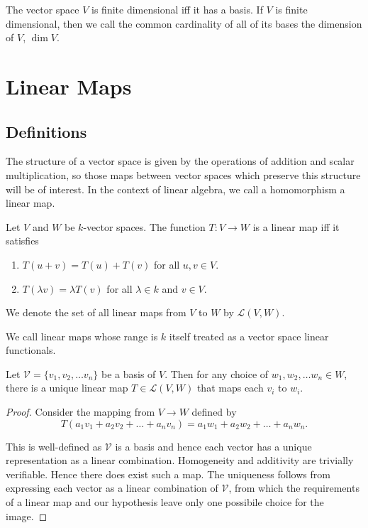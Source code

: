 \documentclass[]{article}
\begin{document}
\begin{defi} 
		The vector space $V$ is finite dimensional iff it has a basis.
		If $V$ is finite dimensional, then we call the common cardinality of all of its bases the dimension of $V$, $\dim V$.
\end{defi}

\section{Linear Maps}

\subsection{Definitions}

The structure of a vector space is given by the operations of addition and scalar multiplication, so those maps between vector spaces which preserve this structure will be of interest. In the context of linear algebra, we call a homomorphism a linear map.

\begin{defi} 
		Let $V$ and $W$ be $k$-vector spaces. The function $T: V \to W$ is a linear map iff it satisfies
		\begin{enumerate}
				\item $T(u + v) = T(u) + T(v)$ for all $u, v \in V$.
				\item $T(\lambda v) = \lambda T(v)$ for all $\lambda \in k$ and $v \in V$.
		\end{enumerate}

		We denote the set of all linear maps from $V$ to $W$ by $\mathcal{L}(V,W)$.

		We call linear maps whose range is $k$ itself treated as a vector space linear functionals.
\end{defi}

\begin{thm}
		Let $\mathcal{V} = \{v_1, v_2, \ldots v_n\}$ be a basis of $V$. Then for any choice of $w_1, w_2, \ldots w_n \in W$, there is a unique linear map $T \in \mathcal{L}(V,W)$ that maps each $v_i$ to $w_i$.
\end{thm}

\begin{proof}
		Consider the mapping from $V \to W$ defined by
		\[
		T(a_1 v_1 + a_2 v_2 + \ldots + a_n v_n) = a_1 w_1 + a_2 w_2 + \ldots + a_n w_n
		.\] 

		This is well-defined as $\mathcal{V}$ is a basis and hence each vector has a unique representation as a linear combination. Homogeneity and additivity are trivially verifiable. Hence there does exist such a map. The uniqueness follows from expressing each vector as a linear combination of $\mathcal{V}$, from which the requirements of a linear map and our hypothesis leave only one possibile choice for the image.
\end{proof}
\end{document}
